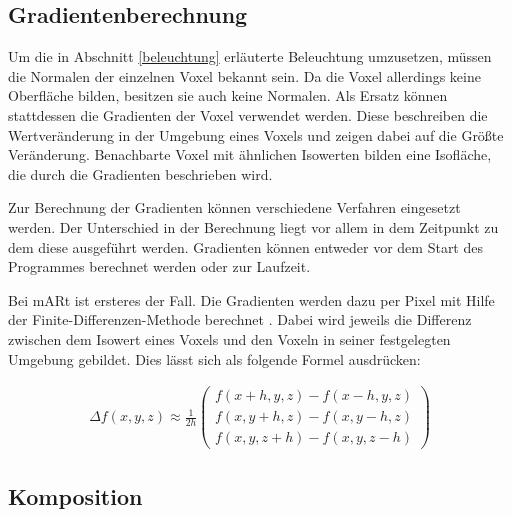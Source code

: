 \subsection{Gradientenberechnung}

Um die in Abschnitt \ref{beleuchtung} erläuterte Beleuchtung umzusetzen, müssen die Normalen der einzelnen Voxel bekannt sein. Da die Voxel allerdings keine Oberfläche bilden, besitzen sie auch keine Normalen. Als Ersatz können stattdessen die Gradienten der Voxel verwendet werden. Diese beschreiben die Wertveränderung in der Umgebung eines Voxels und zeigen dabei auf die Größte Veränderung. Benachbarte Voxel mit ähnlichen Isowerten bilden eine Isofläche, die durch die Gradienten beschrieben wird. 

Zur Berechnung der Gradienten können verschiedene Verfahren eingesetzt werden. Der Unterschied in der Berechnung liegt vor allem in dem Zeitpunkt zu dem diese ausgeführt werden. Gradienten können entweder vor dem Start des Programmes berechnet werden oder zur Laufzeit. 

Bei mARt ist ersteres der Fall. Die Gradienten werden dazu per Pixel mit Hilfe der Finite-Differenzen-Methode berechnet \cite{Hadwiger06}.
Dabei wird jeweils die Differenz zwischen dem Isowert eines Voxels und den Voxeln in seiner festgelegten Umgebung gebildet. Dies lässt sich als folgende Formel ausdrücken: 

\begin{align}
\Delta f(x,y,z)\approx \frac{1}{2h}
\left ( \begin{matrix}
f(x + h, y, z) - f(x - h, y, z)\\ 
f(x, y + h, z) - f(x, y - h, z)\\ 
f(x, y, z + h) - f(x, y, z - h)
\end{matrix} \right )
\end{align}




\subsection{Komposition}

